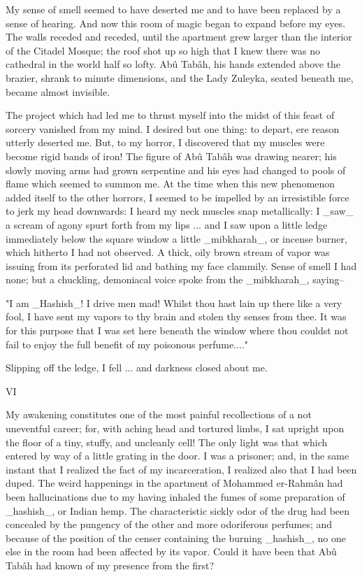 My sense of smell seemed to have deserted me and to have been
replaced by a sense of hearing. And now this room of magic began to
expand before my eyes. The walls receded and receded, until the
apartment grew larger than the interior of the Citadel Mosque; the
roof shot up so high that I knew there was no cathedral in the world
half so lofty. Abû Tabâh, his hands extended above the brazier, shrank
to minute dimensions, and the Lady Zuleyka, seated beneath me, became
almost invisible.

The project which had led me to thrust myself into the midst of this
feast of sorcery vanished from my mind. I desired but one thing: to
depart, ere reason utterly deserted me. But, to my horror, I
discovered that my muscles were become rigid bands of iron! The figure
of Abû Tabâh was drawing nearer; his slowly moving arms had grown
serpentine and his eyes had changed to pools of flame which seemed to
summon me. At the time when this new phenomenon added itself to the
other horrors, I seemed to be impelled by an irresistible force to
jerk my head downwards: I heard my neck muscles snap metallically: I
_saw_ a scream of agony spurt forth from my lips ... and I saw upon a
little ledge immediately below the square window a little _mibkharah_,
or incense burner, which hitherto I had not observed. A thick, oily
brown stream of vapor was issuing from its perforated lid and bathing
my face clammily. Sense of smell I had none; but a chuckling,
demoniacal voice spoke from the _mibkharah_, saying--

"I am _Hashish_! I drive men mad! Whilst thou hast lain up there like
a very fool, I have sent my vapors to thy brain and stolen thy senses
from thee. It was for this purpose that I was set here beneath the
window where thou couldst not fail to enjoy the full benefit of my
poisonous perfume...."

Slipping off the ledge, I fell ... and darkness closed about me.


VI

My awakening constitutes one of the most painful recollections of a
not uneventful career; for, with aching head and tortured limbs, I sat
upright upon the floor of a tiny, stuffy, and uncleanly cell! The only
light was that which entered by way of a little grating in the door.
I was a prisoner; and, in the same instant that I realized the fact
of my incarceration, I realized also that I had been duped. The weird
happenings in the apartment of Mohammed er-Rahmân had been
hallucinations due to my having inhaled the fumes of some preparation
of _hashish_, or Indian hemp. The characteristic sickly odor of the
drug had been concealed by the pungency of the other and more
odoriferous perfumes; and because of the position of the censer
containing the burning _hashish_, no one else in the room had been
affected by its vapor. Could it have been that Abû Tabâh had known
of my presence from the first?

